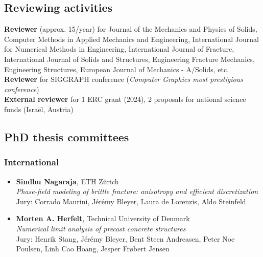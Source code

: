 \subsection*{\textcolor{navier_blue}{Reviewing activities}}
\noindent 
\textbf{Reviewer} (approx. 15/year) for Journal of the Mechanics and Physics of Solids, Computer Methods in Applied Mechanics and Engineering, International Journal for Numerical Methods in Engineering, International Journal of Fracture, International Journal of Solids and Structures, Engineering Fracture Mechanics, Engineering Structures, European Journal of Mechanics - A/Solids, etc.\\
\textbf{Reviewer} for SIGGRAPH conference (\textit{Computer Graphics most prestigious conference})\\
\textbf{External reviewer} for 1 ERC grant (2024), 2 proposals for national science funds (Israël, Austria)


\subsection*{PhD thesis committees}
\subsubsection*{International}
\begin{itemize}[noitemsep]
\item[2023] \textbf{Sindhu Nagaraja}, ETH Zürich\\
\textit{Phase-field modeling of brittle fracture: anisotropy and efficient discretization}\\
Jury: Corrado Maurini, Jérémy Bleyer, Laura de Lorenzis, Aldo Steinfeld
\item[2017] \textbf{Morten A. Herfelt}, Technical University of Denmark\\
\textit{Numerical limit analysis of precast concrete structures}\\
Jury: Henrik Stang, Jérémy Bleyer, Bent Steen Andreasen, Peter Noe Poulsen, Linh Cao Hoang, Jesper Frøbert Jensen
\end{itemize}

